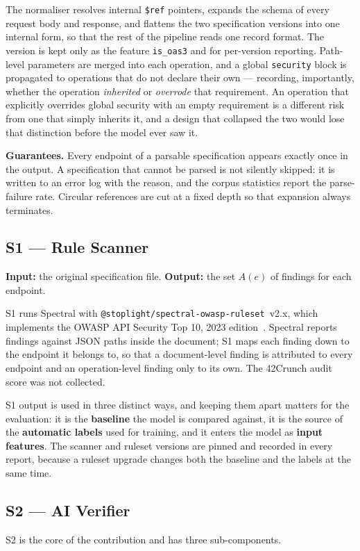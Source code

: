 \documentclass[conference]{IEEEtran}
\begin{document}
The normaliser resolves internal \texttt{\$ref} pointers, expands the schema of every request
body and response, and flattens the two specification versions into one internal form, so
that the rest of the pipeline reads one record format. The version is kept only as the feature \texttt{is\_oas3} and for per-version reporting. Path-level
parameters are merged into each operation, and a global \texttt{security} block is propagated
to operations that do not declare their own --- recording, importantly, whether the operation
\emph{inherited} or \emph{overrode} that requirement. An operation that explicitly overrides
global security with an empty requirement is a different risk from one that simply inherits
it, and a design that collapsed the two would lose that distinction before the model ever
saw it.

\textbf{Guarantees.} Every endpoint of a parsable specification appears exactly once in the
output. A specification that cannot be parsed is not silently skipped: it is written to an
error log with the reason, and the corpus statistics report the parse-failure rate. Circular
references are cut at a fixed depth so that expansion always terminates.

\subsection{S1 --- Rule Scanner}
\textbf{Input:} the original specification file. \textbf{Output:} the set $A(e)$ of findings
for each endpoint.

S1 runs Spectral with \texttt{@stoplight/\allowbreak spectral-\allowbreak owasp-\allowbreak ruleset}~v2.x, which implements the
OWASP API Security Top 10, 2023 edition~\cite{owasptop10,spectralowasp}. Spectral reports
findings against JSON paths inside the document; S1 maps each finding down to the endpoint it
belongs to, so that a document-level finding is attributed to every endpoint and an
operation-level finding only to its own. The 42Crunch audit score was not collected.

S1 output is used in three distinct ways, and keeping them apart matters for the evaluation:
it is the \textbf{baseline} the model is compared against, it is the source of the
\textbf{automatic labels} used for training, and it enters the model as \textbf{input
features}. The scanner and ruleset versions are pinned and recorded in every report, because
a ruleset upgrade changes both the baseline and the labels at the same time.

\subsection{S2 --- AI Verifier}
S2 is the core of the contribution and has three sub-components.
\end{document}
